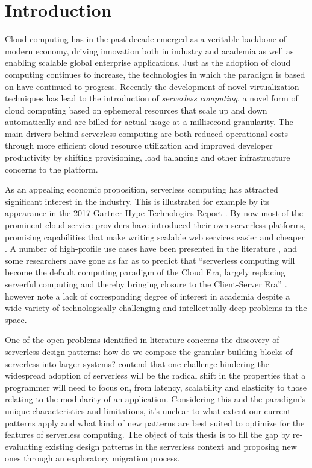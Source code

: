 \chapter{Introduction} \label{cha:introduction}


Cloud computing has in the past decade emerged as a veritable backbone of modern economy, driving innovation both in industry and academia as well as enabling scalable global enterprise applications. Just as the adoption of cloud computing continues to increase, the technologies in which the paradigm is based on have continued to progress. Recently the development of novel virtualization techniques has lead to the introduction of \textit{serverless computing}, a novel form of cloud computing based on ephemeral resources that scale up and down automatically and are billed for actual usage at a millisecond granularity. The main drivers behind serverless computing are both reduced operational costs through more efficient cloud resource utilization and improved developer productivity by shifting provisioning, load balancing and other infrastructure concerns to the platform. \parencite{buyya2017manifesto}

As an appealing economic proposition, serverless computing has attracted significant interest in the industry. This is illustrated for example by its appearance in the 2017 Gartner Hype Technologies Report \parencite{walker17gartnerHype}. By now most of the prominent cloud service providers have introduced their own serverless platforms, promising capabilities that make writing scalable web services easier and cheaper \parencite[e.g.][]{awslambda0218, google18cloudFunctions, ibm18cloudFunctions, microsoft18azureFunctions}. A number of high-profile use cases have been presented in the literature \parencite{cncf18serverlessWG}, and some researchers have gone as far as to predict that ``serverless computing will become the default computing paradigm of the Cloud Era, largely replacing serverful computing and thereby bringing closure to the Client-Server Era'' \parencite{jonas19berkeleyView}. \textcite{baldini17currentTrends} however note a lack of corresponding degree of interest in academia despite a wide variety of technologically challenging and intellectually deep problems in the space.

One of the open problems identified in literature concerns the discovery of serverless design patterns: how do we compose the granular building blocks of serverless into larger systems? \parencite{baldini17currentTrends} \textcite{varghese18next} contend that one challenge hindering the widespread adoption of serverless will be the radical shift in the properties that a programmer will need to focus on, from latency, scalability and elasticity to those relating to the modularity of an application. Considering this and the paradigm's unique characteristics and limitations, it's unclear to what extent our current patterns apply and what kind of new patterns are best suited to optimize for the features of serverless computing. The object of this thesis is to fill the gap by re-evaluating existing design patterns in the serverless context and proposing new ones through an exploratory migration process.

